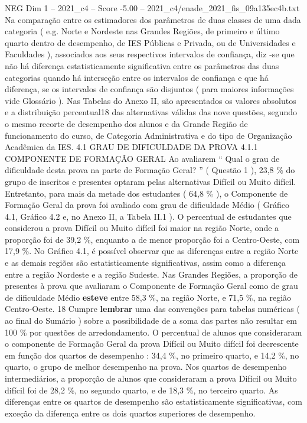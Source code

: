 \begin{textsample}{NEG Dim 1 – 2021\_c4 – Score -5.00 – 2021\_c4/enade\_2021\_fis\_09a135ec4b.txt}
Na comparação entre os estimadores dos parâmetros de duas classes de uma dada categoria ( e.g.
Norte e Nordeste nas Grandes Regiões, de primeiro e último quarto dentro de desempenho, de IES Públicas e Privada, ou de Universidades e Faculdades ), associados aos seus respectivos intervalos de confiança, diz -se que não há diferença estatisticamente significativa entre os parâmetros das duas categorias quando há interseção entre os intervalos de confiança e que há diferença, se os intervalos de confiança são disjuntos ( para maiores informações vide Glossário ).
Nas Tabelas do Anexo II, são apresentados os valores absolutos e a distribuição percentual18 das alternativas válidas das nove questões, segundo o mesmo recorte de desempenho dos alunos e da Grande Região de funcionamento do curso, de Categoria Administrativa e do tipo de Organização Acadêmica da IES. 4.1 GRAU DE DIFICULDADE DA PROVA 4.1.1 COMPONENTE DE FORMAÇÃO GERAL Ao avaliarem “ Qual o grau de dificuldade desta prova na parte de Formação Geral? ” ( Questão 1 ), 23,8 \% do grupo de inscritos e presentes optaram pelas alternativas Difícil ou Muito difícil.
Entretanto, para mais da metade dos estudantes ( 64,8 \% ), o Componente de Formação Geral da prova foi avaliado com grau de dificuldade Médio ( Gráfico 4.1, Gráfico 4.2 e, no Anexo II, a Tabela II.1 ).
O percentual de estudantes que considerou a prova Difícil ou Muito difícil foi maior na região Norte, onde a proporção foi de 39,2 \%, enquanto a de menor proporção foi a Centro-Oeste, com 17,9 \%.
No Gráfico 4.1, é possível observar que as diferenças entre a região Norte e as demais regiões são estatisticamente significativas, assim como a diferença entre a região Nordeste e a região Sudeste.
Nas Grandes Regiões, a proporção de presentes à prova que avaliaram o Componente de Formação Geral como de grau de dificuldade Médio \textbf{esteve} entre 58,3 \%, na região Norte, e 71,5 \%, na região Centro-Oeste. 18 Cumpre \textbf{lembrar} uma das convenções para tabelas numéricas ( ao final do Sumário ) sobre a possibilidade de a soma das partes não resultar em 100 \% por questões de arredondamento.
O percentual de alunos que consideraram o componente de Formação Geral da prova Difícil ou Muito difícil foi decrescente em função dos quartos de desempenho : 34,4 \%, no primeiro quarto, e 14,2 \%, no quarto, o grupo de melhor desempenho na prova.
Nos quartos de desempenho intermediários, a proporção de alunos que consideraram a prova Difícil ou Muito difícil foi de 28,2 \%, no segundo quarto, e de 18,3 \%, no terceiro quarto.
As diferenças entre os quartos de desempenho são estatisticamente significativas, com exceção da diferença entre os dois quartos superiores de desempenho.

\end{textsample}
